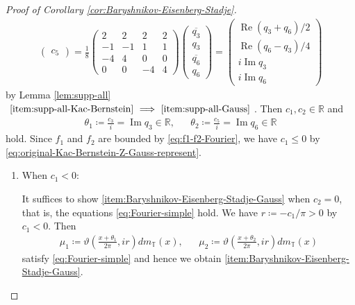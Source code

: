 \documentclass[12pt]{article}
\theoremstyle{definition}
\theoremstyle{remark}
\numberwithin{equation}{section}
\numberwithin{figure}{section}
\numberwithin{table}{section}
\DeclareMathOperator{\im}{Im}
\DeclareMathOperator{\re}{Re}
\begin{document}
\begin{proof}[Proof of Corollary \ref{cor:Baryshnikov-Eisenberg-Stadje}]
\begin{align}
\begin{pmatrix}
        c_5
    \end{pmatrix}
    = \frac{ 1 }{ 8 }
    \begin{pmatrix}
        2 & 2 & 2 & 2 \\
        - 1 & - 1 & 1 & 1 \\
        - 4 & 4 & 0 & 0 \\
        0 & 0 & - 4 & 4
    \end{pmatrix}
    \begin{pmatrix}
        \overline{ q_3 } \\
        q_3 \\
        \overline{ q_6 } \\
        q_6
    \end{pmatrix}
    = 
    \begin{pmatrix}
        \re ( q_3 + q_6 ) / 2 \\
        \re ( q_6 - q_3 ) / 4 \\
        i \im q_3 \\
        i \im q_6
    \end{pmatrix}
    \label{eq:Baryshnikov-Eisenberg-Stadje-proof-const}
\end{align}
by Lemma \ref{lem:supp-all} $ \text{ \ref{item:supp-all-Kac-Bernstein} } \Longrightarrow \text{ \ref{item:supp-all-Gauss} } $.
Then $ c_1 , c_2 \in \mathbb{ R } $ and
\begin{align}
\theta_1 \coloneqq \frac{ c_3 }{ i } = \im q_3 \in \mathbb{ R }, & &
\theta_2 \coloneqq \frac{ c_5 }{ i } = \im q_6 \in \mathbb{ R }
\end{align}
hold.
Since $ f_1 $ and $ f_2 $ are bounded by \eqref{eq:f1-f2-Fourier}, we have $ c_1 \leq 0 $ by \eqref{eq:original-Kac-Bernstein-Z-Gauss-represent}.

\begin{enumerate}[label=(Case \arabic*)]
\item 

When $ c_1 < 0 $:

It suffices to show \ref{item:Baryshnikov-Eisenberg-Stadje-Gauss} when $ c_2 = 0 $, that is, the equations \eqref{eq:Fourier-simple} hold.
We have $ r \coloneqq - c_1 / \pi > 0 $ by $ c_1 < 0 $.
Then
\begin{align}
    \mu_1 \coloneqq \vartheta \left( \frac{ x + \theta_1 }{ 2 \pi } , i r \right) dm_{ \mathbb{ T } } ( x ) , & &
    \mu_2 \coloneqq \vartheta \left( \frac{ x + \theta_2 }{ 2 \pi } , i r \right) dm_{ \mathbb{ T } } ( x )
\end{align}
satisfy \eqref{eq:Fourier-simple} and hence we obtain \ref{item:Baryshnikov-Eisenberg-Stadje-Gauss}.


\end{enumerate}
\end{proof}
\end{document}
